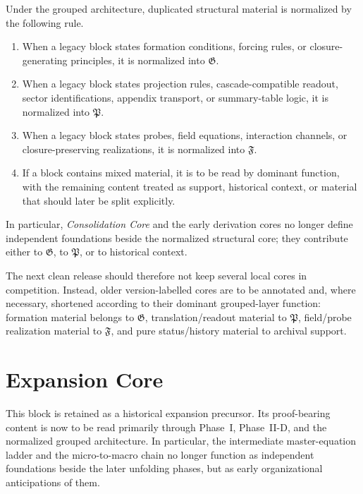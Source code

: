 \begin{proposition}
\label{prop:normalization-map-duplicated-core-material}
Under the grouped architecture, duplicated structural material is normalized by
the following rule.
\begin{enumerate}[leftmargin=2em,label=(\roman*)]
\item When a legacy block states formation conditions, forcing rules, or
closure-generating principles, it is normalized into $\mathfrak G$.
\item When a legacy block states projection rules, cascade-compatible readout,
sector identifications, appendix transport, or summary-table logic, it is
normalized into $\mathfrak P$.
\item When a legacy block states probes, field equations, interaction channels,
or closure-preserving realizations, it is normalized into $\mathfrak F$.
\item If a block contains mixed material, it is to be read by dominant function,
with the remaining content treated as support, historical context, or material
that should later be split explicitly.
\end{enumerate}
In particular, \emph{ Consolidation Core} and the early derivation cores no
longer define independent foundations beside the normalized structural core;
they contribute either to $\mathfrak G$, to $\mathfrak P$, or to historical
context.
\end{proposition}

\begin{remark}
\label{rem:practical-consequence-next-clean-release}
The next clean release should therefore not keep several local cores in
competition. Instead, older version-labelled cores are to be annotated and,
where necessary, shortened according to their dominant grouped-layer function:
formation material belongs to $\mathfrak G$, translation/readout material to
$\mathfrak P$, field/probe realization material to $\mathfrak F$, and pure
status/history material to archival support.
\end{remark}


\section*{ Expansion Core}

\begin{remark}
\label{rem:normalization-note-v130}
This block is retained as a historical expansion precursor. Its proof-bearing content is now to be read primarily through Phase~I, Phase~II-D, and the normalized grouped architecture. In particular, the intermediate master-equation ladder and the micro-to-macro chain no longer function as independent foundations beside the later unfolding phases, but as early organizational anticipations of them.
\end{remark}

